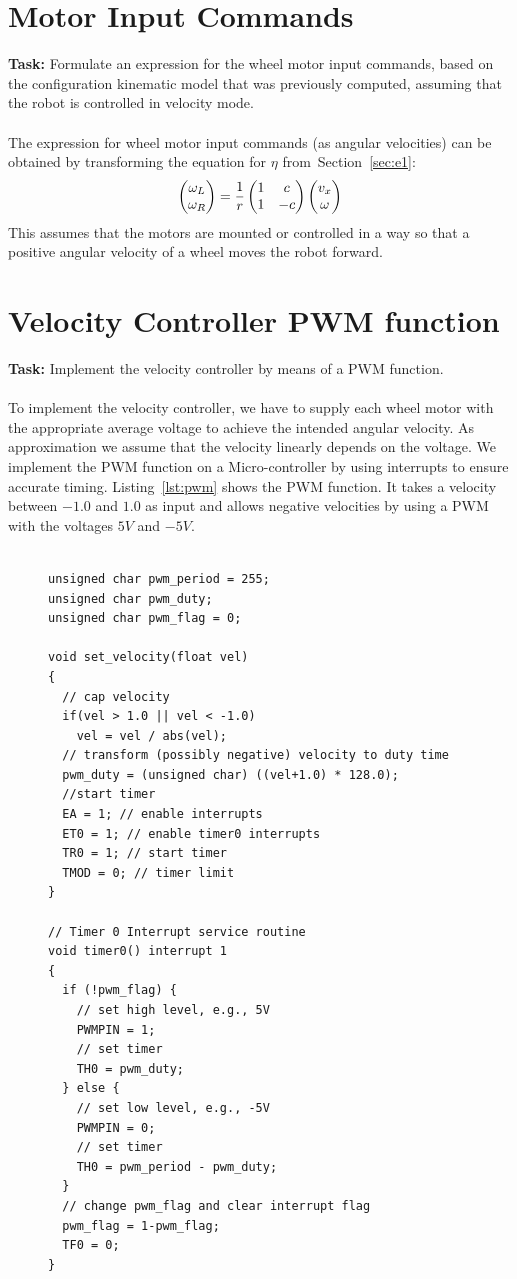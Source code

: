\documentclass[a4paper,11pt]{article}
\newcommand{\refsec}[1]{Section~\ref{#1}}
\newcommand{\reflst}[1]{Listing~\ref{#1}}
\newcommand*\colvec[3][]{
    \begin{pmatrix}\ifx\relax#1\relax\else#1\\\fi#2\\#3\end{pmatrix}
}
\begin{document}
\section{Motor Input Commands}
\label{sec:e2}
\textbf{Task:} Formulate an expression for the wheel motor input commands, based on the configuration kinematic model that was previously computed, assuming that the robot is controlled in velocity mode.\\
\vspace{0.2cm}\\
The expression for wheel motor input commands (as angular velocities) can be obtained by
transforming the equation for $\eta$ from~\refsec{sec:e1}:
$$
\colvec{\omega_L}{\omega_R}=\frac{1}{r}
\begin{pmatrix}
  1 & c \\
  1 & -c
\end{pmatrix}
\colvec{v_x}{\omega}
$$ This assumes that the motors are mounted or controlled in a way so
that a positive angular velocity of a wheel moves the robot forward.

\section{Velocity Controller PWM function}
\label{sec:e3}
\textbf{Task:} Implement the velocity controller by means of a PWM
function.\\
\vspace{0.2cm}\\ To implement the velocity controller, we have to
supply each wheel motor with the appropriate average voltage to
achieve the intended angular velocity. As approximation we assume that
the velocity linearly depends on the voltage. We implement the PWM
function on a Micro-controller by using interrupts to ensure accurate
timing. \reflst{lst:pwm} shows the PWM function. It takes a velocity
between $-1.0$ and $1.0$ as input and allows negative
velocities by using a PWM with the voltages $5V$ and $-5V$.
\begin{figure}
\begin{lstlisting}[showlines,style=SmallCpp, caption={PWM
      function for the velocity controller},
    label=lst:pwm]

unsigned char pwm_period = 255;
unsigned char pwm_duty;
unsigned char pwm_flag = 0;

void set_velocity(float vel)
{
  // cap velocity
  if(vel > 1.0 || vel < -1.0)
    vel = vel / abs(vel);
  // transform (possibly negative) velocity to duty time
  pwm_duty = (unsigned char) ((vel+1.0) * 128.0); 
  //start timer
  EA = 1; // enable interrupts
  ET0 = 1; // enable timer0 interrupts
  TR0 = 1; // start timer
  TMOD = 0; // timer limit
}

// Timer 0 Interrupt service routine
void timer0() interrupt 1 
{
  if (!pwm_flag) {
    // set high level, e.g., 5V
    PWMPIN = 1;
    // set timer
    TH0 = pwm_duty;
  } else {
    // set low level, e.g., -5V
    PWMPIN = 0;
    // set timer
    TH0 = pwm_period - pwm_duty;
  }
  // change pwm_flag and clear interrupt flag
  pwm_flag = 1-pwm_flag;
  TF0 = 0;
}
\end{lstlisting}
\end{figure}
\end{document}
